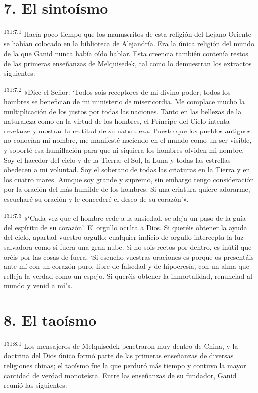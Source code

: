 \section*{7. El sintoísmo}
\par 
\textsuperscript{131:7.1} Hacía poco tiempo que los manuscritos de esta religión del Lejano Oriente se habían colocado en la biblioteca de Alejandría. Era la única religión del mundo de la que Ganid nunca había oído hablar. Esta creencia también contenía restos de las primeras enseñanzas de Melquisedek, tal como lo demuestran los extractos siguientes:

\par 
\textsuperscript{131:7.2} «Dice el Señor: `Todos sois receptores de mi divino poder; todos los hombres se benefician de mi ministerio de misericordia. Me complace mucho la multiplicación de los justos por todas las naciones. Tanto en las bellezas de la naturaleza como en la virtud de los hombres, el Príncipe del Cielo intenta revelarse y mostrar la rectitud de su naturaleza. Puesto que los pueblos antiguos no conocían mi nombre, me manifesté naciendo en el mundo como un ser visible, y soporté esa humillación para que ni siquiera los hombres olviden mi nombre. Soy el hacedor del cielo y de la Tierra; el Sol, la Luna y todas las estrellas obedecen a mi voluntad. Soy el soberano de todas las criaturas en la Tierra y en los cuatro mares. Aunque soy grande y supremo, sin embargo tengo consideración por la oración del más humilde de los hombres. Si una criatura quiere adorarme, escucharé su oración y le concederé el deseo de su corazón'».

\par 
\textsuperscript{131:7.3} «`Cada vez que el hombre cede a la ansiedad, se aleja un paso de la guía del espíritu de su corazón'. El orgullo oculta a Dios. Si queréis obtener la ayuda del cielo, apartad vuestro orgullo; cualquier indicio de orgullo intercepta la luz salvadora como si fuera una gran nube. Si no sois rectos por dentro, es inútil que oréis por las cosas de fuera. `Si escucho vuestras oraciones es porque os presentáis ante mí con un corazón puro, libre de falsedad y de hipocresía, con un alma que refleja la verdad como un espejo. Si queréis obtener la inmortalidad, renunciad al mundo y venid a mí'».

\section*{8. El taoísmo}
\par 
\textsuperscript{131:8.1} Los mensajeros de Melquisedek penetraron muy dentro de China, y la doctrina del Dios único formó parte de las primeras enseñanzas de diversas religiones chinas; el taoísmo fue la que perduró más tiempo y contuvo la mayor cantidad de verdad monoteísta. Entre las enseñanzas de su fundador, Ganid reunió las siguientes:

